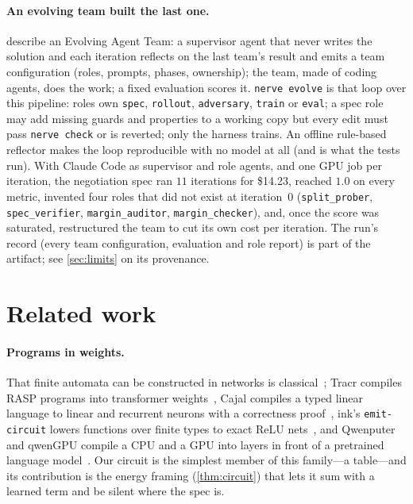 \documentclass{article}
\theoremstyle{plain}
\theoremstyle{definition}
\theoremstyle{remark}
\begin{document}
\paragraph{An evolving team built the last one.} \citet{cao2026eat} describe an Evolving Agent Team: a supervisor agent that never writes the solution and each iteration reflects on the last team's result and emits a team configuration (roles, prompts, phases, ownership); the team, made of coding agents, does the work; a fixed evaluation scores it. \texttt{nerve evolve} is that loop over this pipeline: roles own \texttt{spec}, \texttt{rollout}, \texttt{adversary}, \texttt{train} or \texttt{eval}; a spec role may add missing guards and properties to a working copy but every edit must pass \texttt{nerve check} or is reverted; only the harness trains. An offline rule-based reflector makes the loop reproducible with no model at all (and is what the tests run). With Claude Code as supervisor and role agents, and one GPU job per iteration, the negotiation spec ran $11$ iterations for \$14.23, reached $1.0$ on every metric, invented four roles that did not exist at iteration~0 (\texttt{split\_prober}, \texttt{spec\_verifier}, \texttt{margin\_auditor}, \texttt{margin\_checker}), and, once the score was saturated, restructured the team to cut its own cost per iteration. The run's record (every team configuration, evaluation and role report) is part of the artifact; see \cref{sec:limits} on its provenance.

\section{Related work}
\label{sec:related}

\paragraph{Programs in weights.} That finite automata can be constructed in networks is classical~\citep{omlin1996constructing,siegelmann1995computational}; Tracr compiles RASP programs into transformer weights~\citep{lindner2023tracr}, Cajal compiles a typed linear language to linear and recurrent neurons with a correctness proof~\citep{cajal,cajalrec}, ink's \texttt{emit-circuit} lowers functions over finite types to exact ReLU nets~\citep{inklang}, and Qwenputer and qwenGPU compile a CPU and a GPU into layers in front of a pretrained language model~\citep{qwenputer,qwengpu}. Our circuit is the simplest member of this family---a table---and its contribution is the energy framing (\cref{thm:circuit}) that lets it sum with a learned term and be silent where the spec is.
\end{document}
